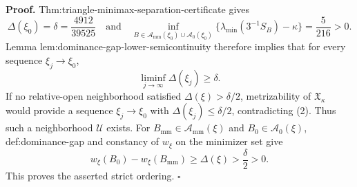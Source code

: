 \textbf{Proof.}
Thm:triangle-minimax-separation-certificate gives
\[
\Delta(\xi_0)=\delta=\frac{4912}{39525}
\quad\text{and}\quad
\inf_{B\in\mathcal A_{\mathrm{mm}}(\xi_0)\cup\mathcal A_0(\xi_0)}
\{\lambda_{\min}(3^{-1}S_B)-\kappa\}=\frac5{216}>0.
\tag{1}
\]
Lemma lem:dominance-gap-lower-semicontinuity therefore implies that for every sequence \(\xi_j\to\xi_0\),
\[
\liminf_{j\to\infty}\Delta(\xi_j)\ge\delta.
\tag{2}
\]
If no relative-open neighborhood satisfied \(\Delta(\xi)>\delta/2\), metrizability of \(\mathfrak X_\kappa\) would provide a sequence \(\xi_j\to\xi_0\) with \(\Delta(\xi_j)\le\delta/2\), contradicting (2).  Thus such a neighborhood \(\mathcal U\) exists.  For \(B_{\mathrm{mm}}\in\mathcal A_{\mathrm{mm}}(\xi)\) and \(B_0\in\mathcal A_0(\xi)\), def:dominance-gap and constancy of \(w_\xi\) on the minimizer set give
\[
w_\xi(B_0)-w_\xi(B_{\mathrm{mm}})
\ge\Delta(\xi)>\frac\delta2>0.
\]
This proves the asserted strict ordering.  \(\square\)